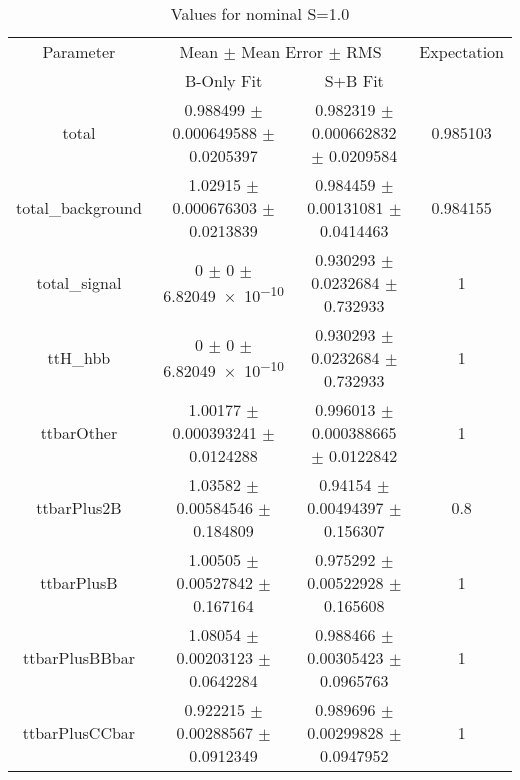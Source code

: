 \begin{table}
\centering
\caption{Values for nominal S=1.0}
\begin{tabular}{cccc}
\toprule
Parameter & \multicolumn{2}{c}{Mean $\pm$ Mean Error $\pm$ RMS} & Expectation\\
 & B-Only Fit & S+B Fit & \\
\midrule
total & \num{0.988499} $\pm$ \num{0.000649588} $\pm$ \num{0.0205397} & \num{0.982319} $\pm$ \num{0.000662832} $\pm$ \num{0.0209584} & \num{0.985103}\\
total\_background & \num{1.02915} $\pm$ \num{0.000676303} $\pm$ \num{0.0213839} & \num{0.984459} $\pm$ \num{0.00131081} $\pm$ \num{0.0414463} & \num{0.984155}\\
total\_signal & \num{0} $\pm$ \num{0} $\pm$ \num{6.82049e-10} & \num{0.930293} $\pm$ \num{0.0232684} $\pm$ \num{0.732933} & \num{1}\\
ttH\_hbb & \num{0} $\pm$ \num{0} $\pm$ \num{6.82049e-10} & \num{0.930293} $\pm$ \num{0.0232684} $\pm$ \num{0.732933} & \num{1}\\
ttbarOther & \num{1.00177} $\pm$ \num{0.000393241} $\pm$ \num{0.0124288} & \num{0.996013} $\pm$ \num{0.000388665} $\pm$ \num{0.0122842} & \num{1}\\
ttbarPlus2B & \num{1.03582} $\pm$ \num{0.00584546} $\pm$ \num{0.184809} & \num{0.94154} $\pm$ \num{0.00494397} $\pm$ \num{0.156307} & \num{0.8}\\
ttbarPlusB & \num{1.00505} $\pm$ \num{0.00527842} $\pm$ \num{0.167164} & \num{0.975292} $\pm$ \num{0.00522928} $\pm$ \num{0.165608} & \num{1}\\
ttbarPlusBBbar & \num{1.08054} $\pm$ \num{0.00203123} $\pm$ \num{0.0642284} & \num{0.988466} $\pm$ \num{0.00305423} $\pm$ \num{0.0965763} & \num{1}\\
ttbarPlusCCbar & \num{0.922215} $\pm$ \num{0.00288567} $\pm$ \num{0.0912349} & \num{0.989696} $\pm$ \num{0.00299828} $\pm$ \num{0.0947952} & \num{1}\\
\bottomrule
\end{tabular}
\end{table}